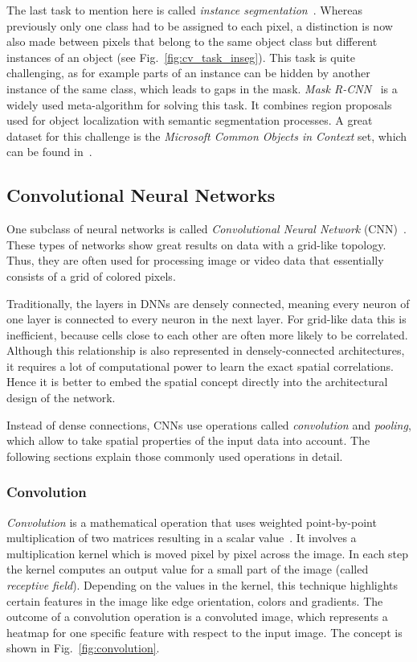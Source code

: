 The last task to mention here is called \emph{instance segmentation}~\cite{mask-rcnn14}. Whereas previously only one class had to be assigned to each pixel, a distinction is now also made between pixels that belong to the same object class but different instances of an object (see Fig.~\ref{fig:cv_task_inseg}). This task is quite challenging, as for example parts of an instance can be hidden by another instance of the same class, which leads to gaps in the mask. \emph{Mask R-CNN}~\cite{mask-rcnn14} is a widely used meta-algorithm for solving this task. It combines region proposals used for object localization with semantic segmentation processes. A great dataset for this challenge is the \emph{Microsoft Common Objects in Context} set, which can be found in~\cite{coco14}.

\subsection{Convolutional Neural Networks}
\label{sec:cnn}

One subclass of neural networks is called \emph{Convolutional Neural Network} (CNN)~\cite[p.~359]{praxiseinstieg_ml17}. These types of networks show great results on data with a grid-like topology. Thus, they are often used for processing image or video data that essentially consists of a grid of colored pixels.

Traditionally, the layers in DNNs are densely connected, meaning every neuron of one layer is connected to every neuron in the next layer. For grid-like data this is inefficient, because cells close to each other are often more likely to be correlated. Although this relationship is also represented in densely-connected architectures, it requires a lot of computational power to learn the exact spatial correlations. Hence it is better to embed the spatial concept directly into the architectural design of the network.

Instead of dense connections, CNNs use operations called \emph{convolution} and \emph{pooling}, which allow to take spatial properties of the input data into account. The following sections explain those commonly used operations in detail.

\subsubsection{Convolution}
\label{sec:convolution}
\emph{Convolution} is a mathematical operation that uses weighted point-by-point multiplication of two matrices resulting in a scalar value~\cite[p.~361 f]{praxiseinstieg_ml17}. It involves a multiplication kernel which is moved pixel by pixel across the image. In each step the kernel computes an output value for a small part of the image (called \emph{receptive field}). Depending on the values in the kernel, this technique highlights certain features in the image like edge orientation, colors and gradients. The outcome of a convolution operation is a convoluted image, which represents a heatmap for one specific feature with respect to the input image. The concept is shown in Fig.~\ref{fig:convolution}.

